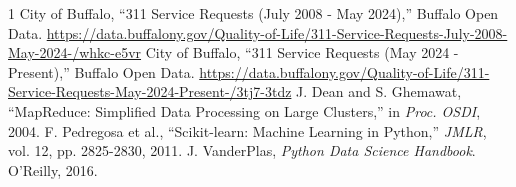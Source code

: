 \documentclass[conference]{IEEEtran}
\begin{document}
\begin{thebibliography}{1}
 City of Buffalo, ``311 Service Requests (July 2008 - May 2024),'' Buffalo Open Data. \url{https://data.buffalony.gov/Quality-of-Life/311-Service-Requests-July-2008-May-2024-/whkc-e5vr}
 City of Buffalo, ``311 Service Requests (May 2024 - Present),'' Buffalo Open Data. \url{https://data.buffalony.gov/Quality-of-Life/311-Service-Requests-May-2024-Present-/3tj7-3tdz}
 J. Dean and S. Ghemawat, ``MapReduce: Simplified Data Processing on Large Clusters,'' in \emph{Proc. OSDI}, 2004.
 F. Pedregosa et al., ``Scikit-learn: Machine Learning in Python,'' \emph{JMLR}, vol. 12, pp. 2825-2830, 2011.
 J. VanderPlas, \emph{Python Data Science Handbook}. O'Reilly, 2016.
\end{thebibliography}
\end{document}

